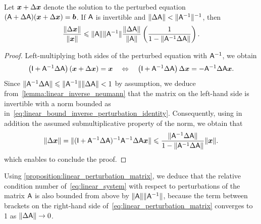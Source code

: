 \begin{proposition}
    \label{proposition:linear_perturbation_matrix}
    Let $\mathbf{\boldsymbol{x}} + \Delta \mathbf{\boldsymbol{x}}$ denote the solution to the perturbed equation $(\mathsf A + \Delta \mathsf A) (\mathbf{\boldsymbol{x}} + \Delta \mathbf{\boldsymbol{x}}) = \mathbf{\boldsymbol{b}}$.
    If $\mathsf A$ is invertible and $\lVert\Delta \mathsf A\rVert < \lVert\mathsf A^{-1}\rVert^{-1}$,
    then
    \begin{equation}
        \label{eq:linear_perturbation_matrix}
        \frac{\lVert\Delta \mathbf{\boldsymbol{x}}\rVert}{\lVert\mathbf{\boldsymbol{x}}\rVert}
        \leqslant \lVert\mathsf A\rVert \lVert\mathsf A^{-1}\rVert \frac{\lVert\Delta \mathsf A\rVert}{\lVert\mathsf A\rVert}
        \left(\frac{1}{1 - \lVert\mathsf A^{-1} \Delta \mathsf A\rVert} \right).
    \end{equation}
\end{proposition}
\begin{proof}
    Left-multiplying both sides of the perturbed equation with $\mathsf A^{-1}$,
    we obtain
    \begin{equation}
        \label{eq:linear_perturbation_matrix_initial}
        \left(\mathsf I + \mathsf A^{-1} \Delta \mathsf A\right) (\mathbf{\boldsymbol{x}} + \Delta \mathbf{\boldsymbol{x}}) = \mathbf{\boldsymbol{x}}
        \quad \Leftrightarrow \quad
        \left(\mathsf I + \mathsf A^{-1} \Delta \mathsf A\right) \Delta \mathbf{\boldsymbol{x}} = - \mathsf A^{-1} \Delta \mathsf A \mathbf{\boldsymbol{x}}.
    \end{equation}
    Since $\lVert\mathsf A^{-1} \Delta \mathsf A\rVert \leqslant \lVert\mathsf A^{-1}\rVert \lVert\Delta \mathsf A\rVert < 1$ by assumption,
    we deduce from~\cref{lemma:linear_inverse_neumann} that the matrix on the left-hand side is invertible
    with a norm bounded as in~\eqref{eq:linear_bound_inverse_perturbation_identity}.
    Consequently,
    using in addition the assumed submultiplicative property of the norm,
    we obtain that
    \[
        \lVert\Delta \mathbf{\boldsymbol{x}}\rVert
        = \lVert(\mathsf I + \mathsf A^{-1} \Delta \mathsf A)^{-1} \mathsf A^{-1} \Delta \mathsf A \mathbf{\boldsymbol{x}}\rVert
        \leqslant \frac{\lVert\mathsf A^{-1} \Delta \mathsf A\rVert}{1 - \lVert\mathsf A^{-1} \Delta \mathsf A\rVert} \lVert\mathbf{\boldsymbol{x}}\rVert.
    \]
    which enables to conclude the proof.
\end{proof}
Using \cref{proposition:linear_perturbation_matrix},
we deduce that the relative condition number of~\eqref{eq:linear_system} with respect to perturbations of the matrix $\mathsf A$ is also bounded from above by $\lVert\mathsf A\rVert \lVert\mathsf A^{-1}\rVert$,
because the term between brackets on the right-hand side of~\eqref{eq:linear_perturbation_matrix} converges to 1 as $\lVert\Delta \mathsf A\rVert \to 0$.


